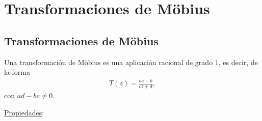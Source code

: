 \chapter{Transformaciones de M\"obius}

\section{Transformaciones de M\"obius}
\begin{defi}
Una transformación de M\"obius es una aplicación racional de grado 1, es decir, de la forma
\begin{align*}
    T(z) = \frac{az + b}{cz + d},
\end{align*}
con $ad - bc \not = 0$.
\end{defi}

\underline{Propiedades}:
